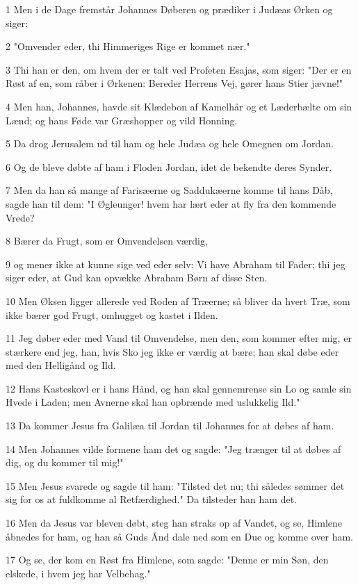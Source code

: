 \par 1 Men i de Dage fremstår Johannes Døberen og prædiker i Judæas Ørken og siger:
\par 2 "Omvender eder, thi Himmeriges Rige er kommet nær."
\par 3 Thi han er den, om hvem der er talt ved Profeten Esajas, som siger: "Der er en Røst af en, som råber i Ørkenen: Bereder Herrens Vej, gører hans Stier jævne!"
\par 4 Men han, Johannes, havde sit Klædebon af Kamelhår og et Læderbælte om sin Lænd; og hans Føde var Græshopper og vild Honning.
\par 5 Da drog Jerusalem ud til ham og hele Judæa og hele Omegnen om Jordan.
\par 6 Og de bleve døbte af ham i Floden Jordan, idet de bekendte deres Synder.
\par 7 Men da han så mange af Farisæerne og Saddukæerne komme til hans Dåb, sagde han til dem: "I Øgleunger! hvem har lært eder at fly fra den kommende Vrede?
\par 8 Bærer da Frugt, som er Omvendelsen værdig,
\par 9 og mener ikke at kunne sige ved eder selv: Vi have Abraham til Fader; thi jeg siger eder, at Gud kan opvække Abraham Børn af disse Sten.
\par 10 Men Øksen ligger allerede ved Roden af Træerne; så bliver da hvert Træ, som ikke bærer god Frugt, omhugget og kastet i Ilden.
\par 11 Jeg døber eder med Vand til Omvendelse, men den, som kommer efter mig, er stærkere end jeg, han, hvis Sko jeg ikke er værdig at bære; han skal døbe eder med den Helligånd og Ild.
\par 12 Hans Kasteskovl er i hans Hånd, og han skal gennemrense sin Lo og samle sin Hvede i Laden; men Avnerne skal han opbrænde med uslukkelig Ild."
\par 13 Da kommer Jesus fra Galilæa til Jordan til Johannes for at døbes af ham.
\par 14 Men Johannes vilde formene ham det og sagde: "Jeg trænger til at døbes af dig, og du kommer til mig!"
\par 15 Men Jesus svarede og sagde til ham: "Tilsted det nu; thi således sømmer det sig for os at fuldkomme al Retfærdighed." Da tilsteder han ham det.
\par 16 Men da Jesus var bleven døbt, steg han straks op af Vandet, og se, Himlene åbnedes for ham, og han så Guds Ånd dale ned som en Due og komme over ham.
\par 17 Og se, der kom en Røst fra Himlene, som sagde: "Denne er min Søn, den elskede, i hvem jeg har Velbehag."

